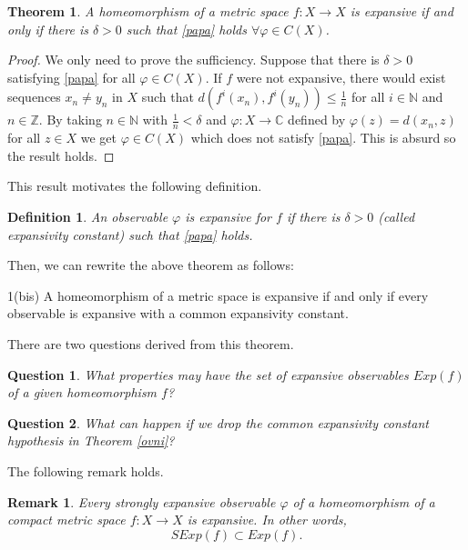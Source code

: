 \documentclass[11pt,letterpaper]{amsart}
\newtheorem{theorem}{Theorem}
\newtheorem{question}{Question}
\newtheorem{definition}{Definition}
\newtheorem{remark}{Remark}
\begin{document}
\begin{theorem}
\label{ex1}
A homeomorphism of a metric space $f:X\to X$ is expansive if and only if there is $\delta>0$ such that \eqref{papa} holds $\forall \varphi\in C(X)$.
\end{theorem}

\begin{proof}
We only need to prove the sufficiency.
Suppose that there is $\delta>0$ satisfying \eqref{papa} for all $\varphi\in C(X)$.
If $f$ were not expansive,
there would exist sequences $x_n\neq y_n$ in $X$ such that
$d(f^i(x_n),f^i(y_n))\leq \frac{1}n$ for all $i\in\mathbb{N}$ and $n\in\mathbb{Z}$.
By taking $n\in\mathbb{N}$ with $\frac{1}n<\delta$ and
$\varphi:X\to \mathbb{C}$ defined by $\varphi(z)=d(x_n,z)$ for all $z\in X$ we get $\varphi\in C(X)$ which
does not satisfy \eqref{papa}. This is absurd so the result holds.
\end{proof}

This result motivates the following definition.

\begin{definition}
An observable $\varphi$ is {\em expansive} for $f$ if there is $\delta>0$
(called {\em expansivity constant}) such that \eqref{papa} holds.
\end{definition}

Then, we can rewrite the above theorem as follows:

\begin{customthm}{1(bis)}\label{ovni}
A homeomorphism of a metric space is expansive if and only if
every observable is expansive with a common expansivity constant.
\end{customthm}

There are two questions derived from this theorem.

\begin{question}
\label{q2}
What properties may have the set of expansive observables $Exp(f)$ of a given homeomorphism $f$?
\end{question}

\begin{question}
\label{q3}
What can happen if we drop the common expansivity constant hypothesis in Theorem \ref{ovni}?
\end{question}

The following remark holds.

\begin{remark}
Every strongly expansive observable $\varphi$ of a homeomorphism of a compact metric space $f:X\to X$ is expansive. In other words,
$$
SExp(f)\subset Exp(f).
$$
\end{remark}
\end{document}
